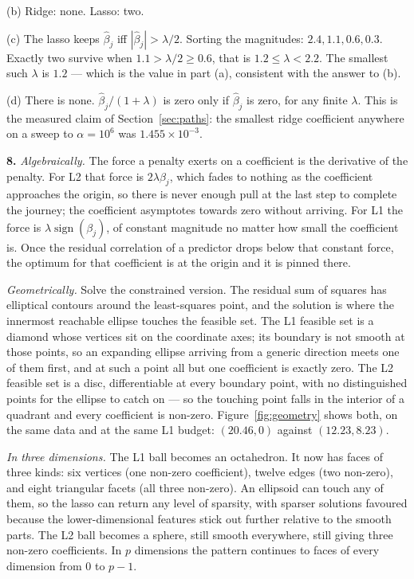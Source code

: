 \documentclass[11pt]{article}
\newcommand{\bhat}{\hat\beta}
\begin{document}
(b) Ridge: none. Lasso: two.

(c) The lasso keeps $\bhat_j$ iff $|\bhat_j| > \lambda/2$. Sorting the
magnitudes: $2.4, 1.1, 0.6, 0.3$. Exactly two survive when
$1.1 > \lambda/2 \ge 0.6$, that is $1.2 \le \lambda < 2.2$. The smallest such
$\lambda$ is $1.2$ --- which is the value in part (a), consistent with the
answer to (b).

(d) There is none. $\bhat_j/(1+\lambda)$ is zero only if $\bhat_j$ is zero,
for any finite $\lambda$. This is the measured claim of
Section~\ref{sec:paths}: the smallest ridge coefficient anywhere on a sweep to
$\alpha = 10^{6}$ was $1.455\times10^{-3}$.

\medskip
\textbf{8.} \emph{Algebraically.} The force a penalty exerts on a coefficient
is the derivative of the penalty. For L2 that force is $2\lambda\beta_j$,
which fades to nothing as the coefficient approaches the origin, so there is
never enough pull at the last step to complete the journey; the coefficient
asymptotes towards zero without arriving. For L1 the force is
$\lambda\operatorname{sign}(\beta_j)$, of constant magnitude no matter how
small the coefficient is. Once the residual correlation of a predictor drops
below that constant force, the optimum for that coefficient is at the origin
and it is pinned there.

\emph{Geometrically.} Solve the constrained version. The residual sum of
squares has elliptical contours around the least-squares point, and the
solution is where the innermost reachable ellipse touches the feasible set.
The L1 feasible set is a diamond whose vertices sit on the coordinate axes;
its boundary is not smooth at those points, so an expanding ellipse arriving
from a generic direction meets one of them first, and at such a point all but
one coefficient is exactly zero. The L2 feasible set is a disc, differentiable
at every boundary point, with no distinguished points for the ellipse to
catch on --- so the touching point falls in the interior of a quadrant and
every coefficient is non-zero. Figure~\ref{fig:geometry} shows both, on the
same data and at the same L1 budget: $(20.46, 0)$ against $(12.23, 8.23)$.

\emph{In three dimensions.} The L1 ball becomes an octahedron. It now has
faces of three kinds: six vertices (one non-zero coefficient), twelve edges
(two non-zero), and eight triangular facets (all three non-zero). An ellipsoid
can touch any of them, so the lasso can return any level of sparsity, with
sparser solutions favoured because the lower-dimensional features stick out
further relative to the smooth parts. The L2 ball becomes a sphere, still
smooth everywhere, still giving three non-zero coefficients. In $p$
dimensions the pattern continues to faces of every dimension from $0$ to
$p-1$.
\end{document}
